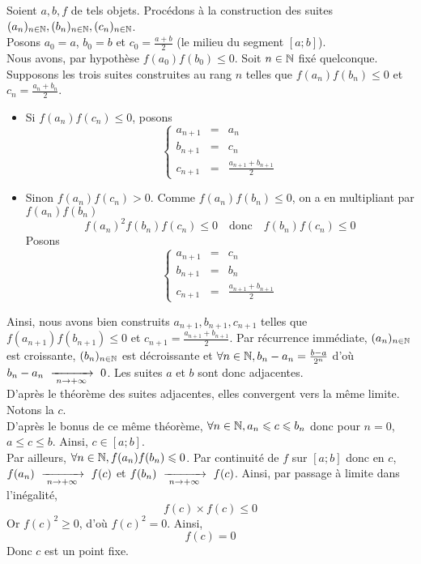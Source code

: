 \documentclass{article}
\begin{document}
\begin{question_kholle}
	\noindent Soient $a,b,f$ de tels objets. Procédons à la construction des suites $(a_n)_{n\in\mathbb N}, (b_n)_{n\in\mathbb N}, (c_n)_{n\in\mathbb N}$.\\
	Posons $a_0 = a$, $b_0 = b$ et $c_0 = \frac{a+b}{2}$ (le milieu du segment $[a;b]$).\\
	Nous avons, par hypothèse $f(a_0)f(b_0) \leqslant 0$.
	Soit $n \in \mathbb N$ fixé quelconque.\\
	Supposons les trois suites construites au rang $n$ telles que $f(a_n)f(b_n) \leqslant 0$ et $c_n = \frac{a_n+b_n}{2}$.
	\begin{itemize}
		\item Si $f(a_n)f(c_n) \leqslant 0$, posons $$\left\{ \begin{array}{lcl}
				      a_{n+1} & = & a_n                       \\
				      b_{n+1} & = & c_n                       \\
				      c_{n+1} & = & \frac{a_{n+1}+b_{n+1}}{2}
			      \end{array} \right.$$
		\item Sinon $f(a_n)f(c_n) > 0$. Comme $f(a_n)f(b_n) \leqslant 0$, on a en multipliant par $f(a_{n})f(b_{n})$ $$f(a_n)^2 f(b_n) f(c_n) \leqslant 0 \quad \text{donc}\quad f(b_n)f(c_n) \leqslant 0$$
		      Posons $$\left\{ \begin{array}{lcl}
				      a_{n+1} & = & c_n                       \\
				      b_{n+1} & = & b_n                       \\
				      c_{n+1} & = & \frac{a_{n+1}+b_{n+1}}{2}
			      \end{array} \right.$$
	\end{itemize}
	Ainsi, nous avons bien construits $a_{n+1}, b_{n+1}, c_{n+1}$ telles que $f(a_{n+1})f(b_{n+1}) \leqslant 0$ et ${ c_{n+1} = \frac{a_{n+1}+b_{n+1}}{2} }$.
	Par récurrence immédiate, $(a_n)_{n\in\mathbb N}$ est croissante, $(b_n)_{n\in\mathbb N}$ est décroissante et ${ \forall n \in \mathbb N, b_n - a_n = \frac{b-a}{2^n} }$ d'où $b_n - a_n \ \xrightarrow[\;n \to +\infty\;]{}\  0$.
	Les suites $a$ et $b$ sont donc adjacentes.\\
	D'après le théorème des suites adjacentes, elles convergent vers la même limite. Notons la $c$.\\
	D'après le bonus de ce même théorème, $\forall n \in \mathbb N, a_n \leqslant c \leqslant b_n$ donc pour $n = 0$, $a \leqslant c \leqslant b$. Ainsi, $c \in [a;b]$.\\
	Par ailleurs, $\forall n \in \mathbb N, f(a_n)f(b_n) \leqslant 0$. Par continuité de $f$ sur $[a;b]$ donc en $c$, $f(a_n) \ \xrightarrow[\;n \to +\infty\;]{}\  f(c)$ et $f(b_n) \ \xrightarrow[\;n \to +\infty\;]{}\  f(c)$. Ainsi, par passage à limite dans l'inégalité,
	\begin{equation*}
		f(c) \times f(c) \leqslant 0
	\end{equation*}
	Or $f(c)^2 \geqslant 0$, d'où $f(c)^2 = 0$. Ainsi,
	\begin{equation*}
		f(c) = 0
	\end{equation*}
	Donc $c$ est un point fixe.

\end{question_kholle}
\end{document}
